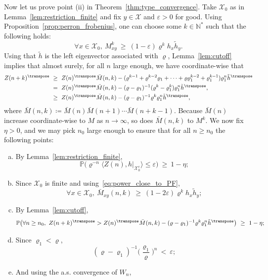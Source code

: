\begin{refsegment}
Now let us prove point (ii) in Theorem~\ref{thm:type_convergence}. Take $\mathcal{X}_0$ as in Lemma~\ref{lem:restriction_finite} and fix $y\in \mathcal{X}$ and $\varepsilon>0$ for good.
Using Proposition~\ref{prop:perron_frobenius}, one can choose some $k\in\mathbb{N}^*$ such that the following holds:
\begin{equation}\label{eq:power_close_to_PF}
  \forall x\in \mathcal{X}_0,\ M^k_{xy}\ \geq\ (1-\varepsilon)\varrho^k h_x\tilde{h}_y.
\end{equation}
%
Using that $\tilde{h}$ is the left eigenvector associated with $\varrho$, Lemma~\ref{lem:cutoff} implies that almost surely, for all $n$ large enough, we have coordinate-wise that
%
\begin{align*}
    Z(n+k)^\transpose \ &\geq\ Z(n)^\transpose \bar{M}(n,k)-(\varrho^{k-1}+\varrho^{k-2}\varrho_1+\cdots + \varrho\varrho_1^{k-2} + \varrho_1^{k-1})\varrho_1^n\tilde{h}^\transpose\\
   & =\  Z(n)^\transpose \bar{M}(n,k)-(\varrho-\varrho_1)^{-1}(\varrho^k-\varrho_1^k)\varrho_1^n\tilde{h}^\transpose, \\
   & \geq\ Z(n)^\transpose \bar{M}(n,k)-(\varrho-\varrho_1)^{-1}\varrho^k\varrho_1^n\tilde{h}^\transpose,
\end{align*}
where $\bar{M}(n,k)\coloneqq\bar{M}(n)\bar{M}(n+1)\cdots \bar{M}(n+k-1)$.
Because $\bar{M}(n)$ increase coordinate-wise to $M$ as $n\to\infty$, so does $\bar{M}(n,k)$ to $M^k$.
We now fix $\eta>0$, and we may pick $n_0$ large enough to ensure that for all $n\geq n_0$ the following points:
\begin{enumerate}[(a)]
  \item By Lemma~\ref{lem:restriction_finite},
  \[
  \mathbb{P}\big(\varrho^{- n}\langle Z(n),h|_{\mathcal{X}_0^c}\rangle \leq \varepsilon\big)\ \geq\ 1-\eta;
  \]
  \item Since $\mathcal{X}_0$ is finite and using~\eqref{eq:power_close_to_PF},
  \[
   \forall x\in \mathcal{X}_0,\ 
    \bar{M}_{xy}(n,k)\ \geq\ (1-2\varepsilon)\varrho^kh_x\tilde{h}_y;
    \]
    \item By Lemma~\ref{lem:cutoff},
    \[
    \mathbb{P}\big(\forall n\geq n_0,\ Z(n+k)^\transpose > Z(n)^\transpose \bar{M}(n,k) - (\varrho-\varrho_1)^{-1}\varrho^k\varrho_1^n\tilde{h}^\transpose \big) \ \geq\ 1-\eta;
    \]  
    \item Since $\varrho_1<\varrho$,
    \[
    \displaystyle (\varrho-\varrho_1)^{-1}\Big(\frac{\varrho_1}{\varrho}\Big)^{n}\ <\ \varepsilon;
    \]
    \item And using the a.s. convergence of $W_n$,

\end{enumerate}
\end{refsegment}
